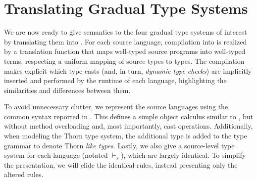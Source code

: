 \documentclass{tex/llncs}
\begin{document}
\medskip

\section{Translating Gradual Type Systems}


\vspace{-2mm}

\noindent
We are now ready to give semantics to the four gradual type systems of
interest by translating them into \kafka.  For each source language,
compilation into \kafka is realized by a translation function that maps
well-typed source programs into well-typed \kafka terms, respecting a
uniform mapping of source types to \kafka types.  The compilation makes
explicit which type casts (and, in turn, \emph{dynamic type-checks}) are
implicitly inserted and performed by the runtime of each language,
highlighting the similarities and differences between them.

To avoid unnecessary clutter, we represent the source languages using the
common syntax reported in .  This defines a simple
object calculus similar to \kafka, but without method overloading and, most
importantly, cast operations. Additionally, when modeling the Thorn type
system, the additional type \CW is added to the type grammar to denote Thorn
\emph{like   types}. Lastly, we also give a source-level type system for 
each language (notated $\vdash_{\!s}$), which are largely identical. To 
simplify the presentation, we will elide the identical rules, instead presenting
only the altered rules.
\end{document}
